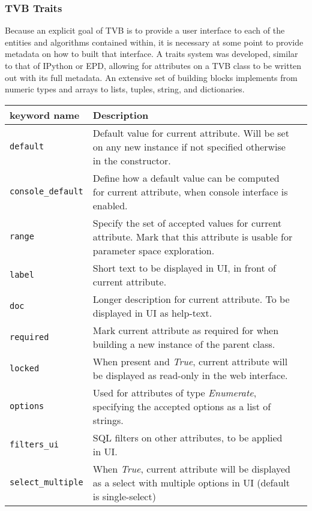 \documentclass{bioinfo}
\begin{document}
\subsubsection{TVB Traits}

Because an explicit goal of TVB is to provide a user interface to each of the
entities and algorithms contained within, it is necessary at some point to
provide metadata on how to built that interface. A traits system was
developed, similar to that of IPython or EPD, allowing for
attributes on a TVB class to be written out with its full metadata. An extensive
set of building blocks implements from numeric types and arrays to
lists, tuples, string, and dictionaries.

\begin{center}
	\begin{table*}[ht]
		\begin{tabularx}{\textwidth}{lll}
			\toprule
			keyword name & Description  \\
			\midrule
			\texttt{default}          & Default value for current attribute. Will be set on any new instance if not specified otherwise in the constructor.  \\
			\texttt{console\_default} & Define how a default value can be computed for current attribute, when console interface is enabled. \\
			\texttt{range}            & Specify the set of accepted values for current attribute. Mark that this attribute is usable for parameter space exploration. \\
			\texttt{label}            & Short text to be displayed in UI, in front of current attribute. \\
			\texttt{doc}              & Longer description for current attribute. To be displayed in UI as help-text. \\
			\texttt{required}         & Mark current attribute as required for when building a new instance of the parent class. \\
			\texttt{locked}           & When present and \emph{True}, current attribute will be displayed as read-only in the web interface. \\
			\texttt{options}          & Used for attributes of type \emph{Enumerate}, specifying the accepted options as a list of strings. \\
			\texttt{filters\_ui}      & SQL filters on other attributes, to be applied in UI. \\
			\texttt{select\_multiple} & When \emph{True}, current attribute will be displayed as a select with multiple options in UI (default is single-select) \\

\end{tabularx}
\end{table*}
\end{center}
\end{document}
